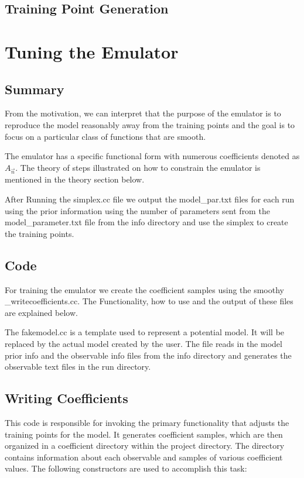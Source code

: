 \documentclass[12pt]{article}
\numberwithin{equation}{section}
\numberwithin{figure}{section}
\begin{document}
\subsection{Training Point Generation}


\section{Tuning the Emulator}

\subsection{Summary}

From the motivation, we can interpret that the purpose of the emulator is to reproduce the model reasonably away from the training points and the goal is to focus on a particular class of functions that are smooth. 

The emulator has a specific functional form with numerous coefficients denoted as $A_{\vec{n}}$. The theory of steps illustrated on how to constrain the emulator is mentioned in the theory section below. 

After Running the simplex.cc file we output the model\_par.txt files for each run using the prior information using the number of parameters sent from the model\_parameter.txt file from the info directory and use the simplex to create the training points.

\subsection{Code}

For training the emulator we create the coefficient samples using the smoothy
\_writecoefficients.cc. The Functionality, how to use and the output of these files are explained below.

The fakemodel.cc is a template used to represent a potential model. It will be replaced by the actual model created by the user. The file reads in the model prior info and the observable info files from the info directory and generates the observable text files in the run directory. 
 
\subsection{Writing Coefficients}

This code is responsible for invoking the primary functionality that adjusts the training points for the model. It generates coefficient samples, which are then organized in a coefficient directory within the project directory. The directory contains information about each observable and samples of various coefficient values. The following constructors are used to accomplish this task:
\end{document}

